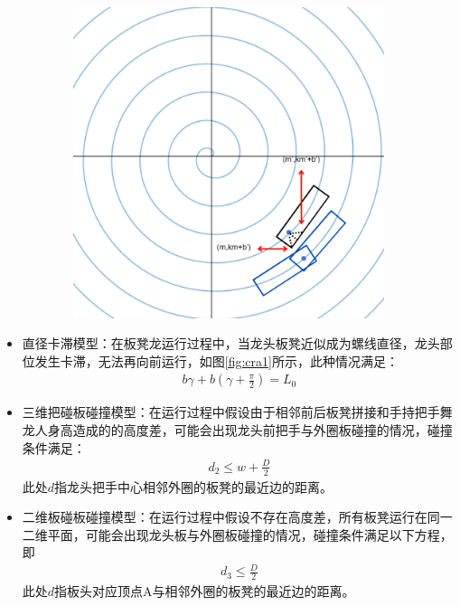 \documentclass[withoutpreface,bwprint]{cumcmthesis}
\begin{document}
\begin{figure}[htbp!]
\begin{subfigure}[t]{0.32\textwidth}
		\label{fig:cra2}
	\end{subfigure}\\
	\begin{subfigure}[t]{0.32\textwidth}
		\includegraphics[width=\textwidth]{pics/s21}
		\label{fig:cra3}
	\end{subfigure}
	\label{a}
\end{figure}
\begin{itemize}
	\item 直径卡滞模型：在板凳龙运行过程中，当龙头板凳近似成为螺线直径，龙头部位发生卡滞，无法再向前运行，如图\ref{fig:cra1}所示，此种情况满足： 
	\begin{align*}
		b\gamma + b(\gamma+\frac{\pi}{2}) = L_0
	\end{align*}
	\item 三维把碰板碰撞模型：在运行过程中假设由于相邻前后板凳拼接和手持把手舞龙人身高造成的的高度差，可能会出现龙头前把手与外圈板碰撞的情况，碰撞条件满足：
	\begin{align*}
		d_2 \leq w+\frac{D}{2}
	\end{align*}
	此处$d$指龙头把手中心相邻外圈的板凳的最近边的距离。
	\item 二维板碰板碰撞模型：在运行过程中假设不存在高度差，所有板凳运行在同一二维平面，可能会出现龙头板与外圈板碰撞的情况，碰撞条件满足以下方程，即
	\begin{align}
		d_3 \leq \frac{D}{2}
	\end{align}
	此处$d$指板头对应顶点A与相邻外圈的板凳的最近边的距离。
\end{itemize}
\end{document}
